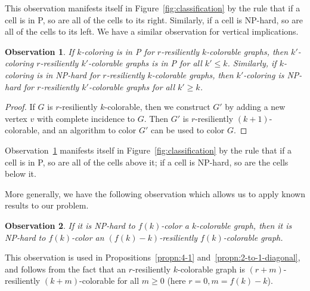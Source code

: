 \documentclass[10pt]{article}
\newtheorem{obs}{Observation}
\begin{document}
This observation manifests itself in Figure~\ref{fig:classification} by the rule
that if a cell is in P, so are all of the cells to its right. Similarly, if a
cell is NP-hard, so are all of the cells to its left. We have a similar
observation for vertical implications. 

\begin{obs}\label{obs:vertical}
If $k$-coloring is in P for $r$-resiliently $k$-colorable graphs, then
$k'$-coloring $r$-resiliently $k'$-colorable graphs is in P for all $k' \leq
k$. Similarly, if $k$-coloring is in NP-hard for $r$-resiliently $k$-colorable
graphs, then $k'$-coloring is NP-hard for $r$-resiliently $k'$-colorable graphs
for all $k' \geq k$.
\end{obs}
\begin{proof}
If $G$ is $r$-resiliently $k$-colorable, then we construct $G'$ by adding a
new vertex $v$ with complete incidence to $G$. Then $G'$ is $r$-resiliently
$(k+1)$-colorable, and an algorithm to color $G'$ can be used to color $G$.
\end{proof}

Observation~\ref{obs:vertical} manifests itself in
Figure~\ref{fig:classification} by the rule that if a cell is in P, so are all
of the cells above it; if a cell is NP-hard, so are the cells below it.

More generally, we have the following observation which allows us to apply known
results to our problem.

\begin{obs}\label{obs:function-bound}
If it is NP-hard to $f(k)$-color a $k$-colorable graph, then it is NP-hard to
$f(k)$-color an $(f(k)-k)$-resiliently $f(k)$-colorable graph.
\end{obs}

This observation is used in Propositions~\ref{propn:4-1}
and~\ref{propn:2-to-1-diagonal}, and follows from the fact that an
$r$-resiliently $k$-colorable graph is $(r+m)$-resiliently $(k+m)$-colorable
for all $m \geq 0$ (here $r = 0, m = f(k) - k$). 
\end{document}
